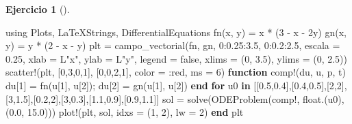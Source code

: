 \documentclass[
  spanish,
  a4paper,
]{scrreport}
\newenvironment{Shaded}{\begin{snugshade}}{\end{snugshade}}
\newcommand{\BuiltInTok}[1]{\textcolor[rgb]{0.00,0.23,0.31}{#1}}
\newcommand{\ConstantTok}[1]{\textcolor[rgb]{0.56,0.35,0.01}{#1}}
\newcommand{\ControlFlowTok}[1]{\textcolor[rgb]{0.00,0.23,0.31}{\textbf{#1}}}
\newcommand{\FloatTok}[1]{\textcolor[rgb]{0.68,0.00,0.00}{#1}}
\newcommand{\FunctionTok}[1]{\textcolor[rgb]{0.28,0.35,0.67}{#1}}
\newcommand{\ImportTok}[1]{\textcolor[rgb]{0.00,0.46,0.62}{#1}}
\newcommand{\KeywordTok}[1]{\textcolor[rgb]{0.00,0.23,0.31}{\textbf{#1}}}
\newcommand{\NormalTok}[1]{\textcolor[rgb]{0.00,0.23,0.31}{#1}}
\newcommand{\OperatorTok}[1]{\textcolor[rgb]{0.37,0.37,0.37}{#1}}
\newcommand{\StringTok}[1]{\textcolor[rgb]{0.13,0.47,0.30}{#1}}
\theoremstyle{definition}
\newtheorem{exercise}{Ejercicio}[chapter]
\theoremstyle{remark}
\begin{document}
\begin{exercise}[]
\begin{enumerate}
\begin{tcolorbox}
\begin{Shaded}
\begin{Highlighting}[]
\ImportTok{using} \BuiltInTok{Plots}\NormalTok{, }\BuiltInTok{LaTeXStrings}\NormalTok{, }\BuiltInTok{DifferentialEquations}
\FunctionTok{fn}\NormalTok{(x, y) }\OperatorTok{=}\NormalTok{ x }\OperatorTok{*}\NormalTok{ (}\FloatTok{3} \OperatorTok{{-}}\NormalTok{ x }\OperatorTok{{-}} \FloatTok{2}\NormalTok{y)}
\FunctionTok{gn}\NormalTok{(x, y) }\OperatorTok{=}\NormalTok{ y }\OperatorTok{*}\NormalTok{ (}\FloatTok{2} \OperatorTok{{-}}\NormalTok{ x }\OperatorTok{{-}}\NormalTok{ y)}
\NormalTok{plt }\OperatorTok{=} \FunctionTok{campo\_vectorial}\NormalTok{(fn, gn, }\FloatTok{0}\OperatorTok{:}\FloatTok{0.25}\OperatorTok{:}\FloatTok{3.5}\NormalTok{, }\FloatTok{0}\OperatorTok{:}\FloatTok{0.2}\OperatorTok{:}\FloatTok{2.5}\NormalTok{, escala }\OperatorTok{=} \FloatTok{0.25}\NormalTok{,}
\NormalTok{    xlab }\OperatorTok{=}\NormalTok{ L}\StringTok{"x"}\NormalTok{, ylab }\OperatorTok{=}\NormalTok{ L}\StringTok{"y"}\NormalTok{, legend }\OperatorTok{=} \ConstantTok{false}\NormalTok{, xlims }\OperatorTok{=}\NormalTok{ (}\FloatTok{0}\NormalTok{, }\FloatTok{3.5}\NormalTok{), ylims }\OperatorTok{=}\NormalTok{ (}\FloatTok{0}\NormalTok{, }\FloatTok{2.5}\NormalTok{))}
\FunctionTok{scatter!}\NormalTok{(plt, [}\FloatTok{0}\NormalTok{,}\FloatTok{3}\NormalTok{,}\FloatTok{0}\NormalTok{,}\FloatTok{1}\NormalTok{], [}\FloatTok{0}\NormalTok{,}\FloatTok{0}\NormalTok{,}\FloatTok{2}\NormalTok{,}\FloatTok{1}\NormalTok{], color }\OperatorTok{=} \OperatorTok{:}\NormalTok{red, ms }\OperatorTok{=} \FloatTok{6}\NormalTok{)}
\KeywordTok{function} \FunctionTok{comp!}\NormalTok{(du, u, p, t)}
\NormalTok{    du[}\FloatTok{1}\NormalTok{] }\OperatorTok{=} \FunctionTok{fn}\NormalTok{(u[}\FloatTok{1}\NormalTok{], u[}\FloatTok{2}\NormalTok{]); du[}\FloatTok{2}\NormalTok{] }\OperatorTok{=} \FunctionTok{gn}\NormalTok{(u[}\FloatTok{1}\NormalTok{], u[}\FloatTok{2}\NormalTok{])}
\KeywordTok{end}
\ControlFlowTok{for}\NormalTok{ u0 }\KeywordTok{in}\NormalTok{ [[}\FloatTok{0.5}\NormalTok{,}\FloatTok{0.4}\NormalTok{],[}\FloatTok{0.4}\NormalTok{,}\FloatTok{0.5}\NormalTok{],[}\FloatTok{2}\NormalTok{,}\FloatTok{2}\NormalTok{],[}\FloatTok{3}\NormalTok{,}\FloatTok{1.5}\NormalTok{],[}\FloatTok{0.2}\NormalTok{,}\FloatTok{2}\NormalTok{],[}\FloatTok{3}\NormalTok{,}\FloatTok{0.3}\NormalTok{],[}\FloatTok{1.1}\NormalTok{,}\FloatTok{0.9}\NormalTok{],[}\FloatTok{0.9}\NormalTok{,}\FloatTok{1.1}\NormalTok{]]}
\NormalTok{    sol }\OperatorTok{=} \FunctionTok{solve}\NormalTok{(}\FunctionTok{ODEProblem}\NormalTok{(comp!, }\FunctionTok{float}\NormalTok{.(u0), (}\FloatTok{0.0}\NormalTok{, }\FloatTok{15.0}\NormalTok{)))}
    \FunctionTok{plot!}\NormalTok{(plt, sol, idxs }\OperatorTok{=}\NormalTok{ (}\FloatTok{1}\NormalTok{, }\FloatTok{2}\NormalTok{), lw }\OperatorTok{=} \FloatTok{2}\NormalTok{)}
\ControlFlowTok{end}
\NormalTok{plt}
\end{Highlighting}
\end{Shaded}


\end{tcolorbox}
\end{enumerate}
\end{exercise}
\end{document}
